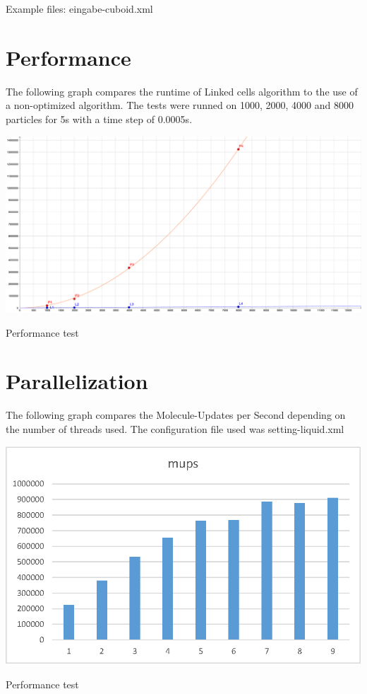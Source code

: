 Example files\+: eingabe-\/cuboid.\+xml\hypertarget{index_perf_sec}{}\section{Performance}\label{index_perf_sec}
The following graph compares the runtime of Linked cells algorithm to the use of a non-\/optimized algorithm. The tests were runned on 1000, 2000, 4000 and 8000 particles for 5s with a time step of 0.\+0005s.   
\begin{DoxyImage}
\includegraphics[width=40cm]{test}
\caption{Performance test}
\end{DoxyImage}
\hypertarget{index_thread_sec}{}\section{Parallelization}\label{index_thread_sec}
The following graph compares the Molecule-\/\+Updates per Second depending on the number of threads used. The configuration file used was setting-\/liquid.\+xml   
\begin{DoxyImage}
\includegraphics[width=40cm]{mups}
\caption{Performance test}
\end{DoxyImage}
 